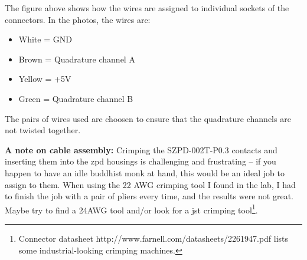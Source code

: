 \documentclass[twoside]{article}
\begin{document}
The figure above shows how the wires are assigned to individual sockets of the connectors. In the photos, the wires are: 

\begin{itemize}
\item White = GND
\item Brown = Quadrature channel A
\item Yellow = +5V
\item Green = Quadrature channel B
\end{itemize}

The pairs of wires used are choosen to ensure that the quadrature channels are not twisted together.

\noindent\textbf{A note on cable assembly:} Crimping the SZPD-002T-P0.3 contacts and inserting them into the zpd housings is challenging and frustrating -- if you happen to have an idle buddhist monk at hand, this would be an ideal job to assign to them. When using the 22 AWG crimping tool I found in the lab, I had to finish the job with a pair of pliers every time, and the results were not great. Maybe try to find a 24AWG tool and/or look for a jst crimping tool\footnote{Connector datasheet http://www.farnell.com/datasheets/2261947.pdf lists some industrial-looking crimping machines.}.

\newpage{}
\end{document}
